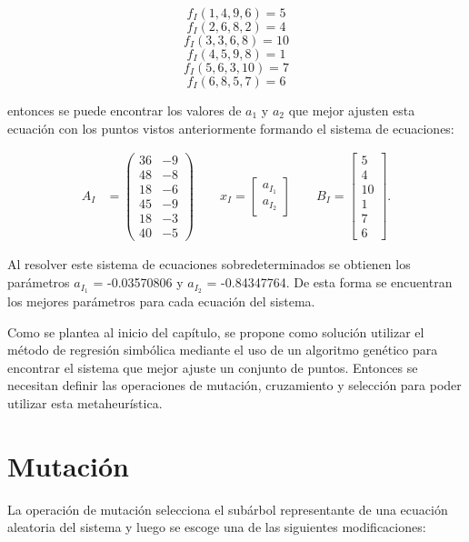 $$f_I(1, 4, 9, 6) = 5 $$
$$f_I(2, 6, 8, 2) = 4 $$
$$f_I(3, 3, 6, 8) = 10$$
$$f_I(4, 5, 9, 8) = 1 $$
$$f_I(5, 6, 3, 10) =7 $$
$$f_I(6, 8, 5, 7) = 6 $$

entonces se puede encontrar los valores de $a_1$ y $a_2$ que mejor ajusten esta ecuación con los puntos vistos anteriormente formando el sistema de ecuaciones:

\begin{align*}
    A_I & = \begin{pmatrix}
        36 & -9 \\
        48 & -8 \\
        18 & -6 \\
        45 & -9 \\
        18 & -3 \\
        40 & -5
    \end{pmatrix}
    \qquad
    x_I = \begin{bmatrix}
        a_{I_1} \\
        a_{I_2}
    \end{bmatrix}
    \qquad
    B_I = \begin{bmatrix}
        5  \\
        4  \\
        10 \\
        1  \\
        7  \\
        6
    \end{bmatrix}.
\end{align*}

Al resolver este sistema de ecuaciones sobredeterminados se obtienen los parámetros $a_{I_1}$ = -0.03570806 y $a_{I_2}$ = -0.84347764. De esta forma se encuentran los mejores parámetros para cada ecuación del sistema.

Como se plantea al inicio del capítulo, se propone como solución utilizar el método de regresión simbólica mediante el uso de un algoritmo genético para encontrar el sistema que mejor ajuste un conjunto de puntos. Entonces se necesitan definir las operaciones de mutación, cruzamiento y selección para poder utilizar esta metaheurística.

\section{Mutación}

La operación de mutación selecciona el subárbol representante de una ecuación aleatoria del sistema y luego se escoge una de las siguientes modificaciones:

